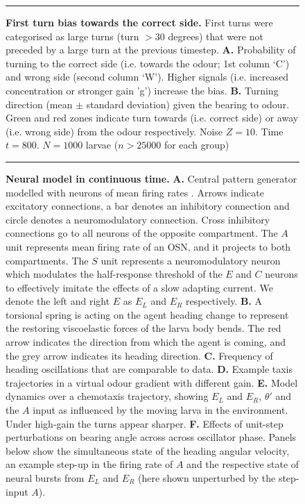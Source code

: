 \documentclass[11pt,a4paper]{article}
\newcommand{\todoBW}[1]{\todo[author=BW,color=orange, size=\tiny,inline]{#1}}
\begin{document}
\begin{figure}
\begin{center}
\caption{{\bf First turn bias towards the correct side.} First turns were categorised as large turns (turn $>30$ degrees) that were not preceded by a large turn at the previous timestep.
{\bf A.} Probability of turning to the correct side (i.e. towards the odour; 1st column ‘C’) and wrong side (second column ‘W’). Higher signals (i.e. increased concentration or stronger gain 'g') increase the bias.
{\bf B.} Turning direction (mean $\pm$ standard deviation) given the bearing to odour. Green and red zones indicate turn towards (i.e. correct side) or away (i.e. wrong side) from the odour respectively. Noise $Z = 10$. Time $t=800$. $N=1000$ larvae ($n > 25000$ for each group)
\label{fig:FirstTurn}}
\hrule
\end{center}
\end{figure}


\begin{figure}
\begin{center}
\caption{{\bf Neural model in continuous time.} {\bf A.} Central pattern generator modelled with neurons of mean firing rates  \citep[adapted from ][]{wilson1999spikes}.
  Arrows indicate excitatory connections, a bar denotes an inhibitory connection and circle denotes a neuromodulatory connection. Cross inhibitory connections go to all neurons of the opposite compartment.
   The $A$ unit represents mean firing rate of an OSN, and it projects to both compartments.
   The $S$ unit represents a neuromodulatory neuron which  modulates the half-response threshold of the $E$ and $C$ neurons  to effectively imitate the effects of a slow adapting current. We denote the left and right $E$ as $E_L$ and $E_R$ respectively.
{\bf B.} A torsional spring is acting on the agent heading change to represent the restoring viscoelastic forces of the larva body bends. The red arrow indicates the direction from which the agent is coming, and the grey arrow indicates its heading direction.
{\bf C.} Frequency of heading oscillations that are comparable to data.
{\bf D.} Example taxis trajectories in a virtual odour gradient with different gain.
{\bf E.} Model dynamics over a chemotaxis trajectory, showing $E_L$ and  $E_R$, $\theta'$ and the $A$ input as influenced by the moving larva in the environment. Under high-gain the turns appear sharper.
{\bf F.} Effects of unit-step perturbations on bearing angle across across oscillator phase.
 Panels below show the simultaneous state of the heading angular velocity, an example step-up in the firing rate of $A$ and the respective state of neural bursts from $E_L$ and $E_R$ (here shown unperturbed by the step-input $A$).
\label{fig:LampreyModel}}
\hrule
\end{center}
\end{figure}
\end{document}
